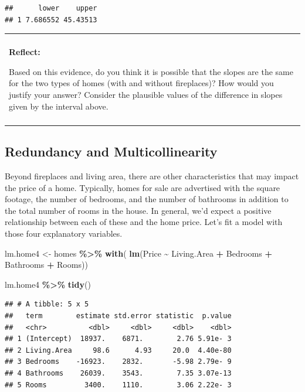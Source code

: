 \documentclass[
]{book}
\newenvironment{Shaded}{\begin{snugshade}}{\end{snugshade}}
\newcommand{\FunctionTok}[1]{\textcolor[rgb]{0.13,0.29,0.53}{\textbf{#1}}}
\newcommand{\NormalTok}[1]{#1}
\newcommand{\OtherTok}[1]{\textcolor[rgb]{0.56,0.35,0.01}{#1}}
\newcommand{\SpecialCharTok}[1]{\textcolor[rgb]{0.81,0.36,0.00}{\textbf{#1}}}
\newenvironment{reflect}
{
    \begin{center}
    
    \begin{tabular}{|p{0.8\textwidth}|}
    \rowcolor{LightBlue}
    \hline\\
    \rowcolor{LightBlue}
    \textbf{Reflect:}
}
{
    \\\rowcolor{LightBlue}
    \\\hline
    \end{tabular} 
    \end{center}
}
\begin{document}
\begin{verbatim}
##      lower    upper
## 1 7.686552 45.43513
\end{verbatim}

\begin{reflect}
Based on this evidence, do you think it is possible that the slopes are
the same for the two types of homes (with and without fireplaces)? How
would you justify your answer? Consider the plausible values of the
difference in slopes given by the interval above.
\end{reflect}

\subsection{Redundancy and Multicollinearity}\label{redundant}

Beyond fireplaces and living area, there are other characteristics that may impact the price of a home. Typically, homes for sale are advertised with the square footage, the number of bedrooms, and the number of bathrooms in addition to the total number of rooms in the house. In general, we'd expect a positive relationship between each of these and the home price. Let's fit a model with those four explanatory variables.

\begin{Shaded}
\begin{Highlighting}[]
\NormalTok{lm.home4 }\OtherTok{\textless{}{-}}\NormalTok{ homes }\SpecialCharTok{\%\textgreater{}\%} 
  \FunctionTok{with}\NormalTok{( }\FunctionTok{lm}\NormalTok{(Price }\SpecialCharTok{\textasciitilde{}}\NormalTok{ Living.Area }\SpecialCharTok{+}\NormalTok{ Bedrooms }\SpecialCharTok{+}\NormalTok{ Bathrooms }\SpecialCharTok{+}\NormalTok{ Rooms))}

\NormalTok{lm.home4 }\SpecialCharTok{\%\textgreater{}\%} 
  \FunctionTok{tidy}\NormalTok{()}
\end{Highlighting}
\end{Shaded}

\begin{verbatim}
## # A tibble: 5 x 5
##   term        estimate std.error statistic  p.value
##   <chr>          <dbl>     <dbl>     <dbl>    <dbl>
## 1 (Intercept)  18937.    6871.        2.76 5.91e- 3
## 2 Living.Area     98.6      4.93     20.0  4.40e-80
## 3 Bedrooms    -16923.    2832.       -5.98 2.79e- 9
## 4 Bathrooms    26039.    3543.        7.35 3.07e-13
## 5 Rooms         3400.    1110.        3.06 2.22e- 3
\end{verbatim}
\end{document}
